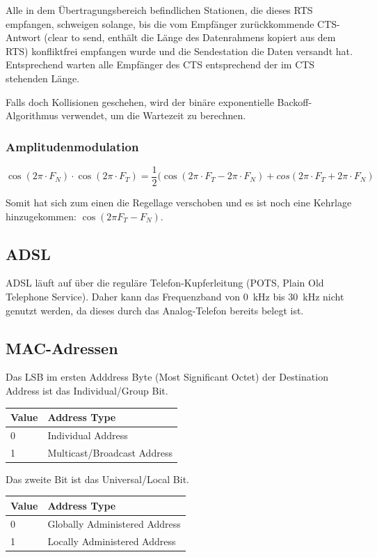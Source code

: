 Alle in dem Übertragungsbereich befindlichen Stationen, die dieses RTS
empfangen, schweigen solange, bis die vom Empfänger zurückkommende CTS-Antwort
(clear to send, enthält die Länge des Datenrahmens kopiert aus dem RTS)
konfliktfrei empfangen wurde und die Sendestation die Daten versandt hat.
Entsprechend warten alle Empfänger des CTS entsprechend der im CTS stehenden
Länge.

Falls doch Kollisionen geschehen, wird der binäre exponentielle
Backoff-Algorithmus verwendet, um die Wartezeit zu berechnen.

\subsubsection{Amplitudenmodulation}

\[
	\cos (2\pi \cdot F_N) \cdot \cos (2\pi \cdot F_T)
	= \frac{1}{2}(\cos (2\pi \cdot F_T - 2\pi \cdot F_N)
	+ cos(2\pi \cdot F_T + 2\pi \cdot F_N)
\]

Somit hat sich zum einen die Regellage verschoben und es ist noch eine Kehrlage
hinzugekommen: $\cos (2\pi F_T - F_N)$.


\subsection{ADSL}

ADSL läuft auf über die reguläre Telefon-Kupferleitung (POTS, Plain Old
Telephone Service). Daher kann das Frequenzband von 0~kHz bis 30~kHz nicht
genutzt werden, da dieses durch das Analog-Telefon bereits belegt ist.


\subsection{MAC-Adressen}

Das LSB im ersten Adddress Byte (Most Significant Octet) der Destination Address
ist das Individual/Group Bit.

\begin{tabular}[h]{|l|l|}
	\hline
  \textbf{Value} & \textbf{Address Type} \\
	\hline
  0 & Individual Address \\
  1 & Multicast/Broadcast Address \\
	\hline
\end{tabular}

Das zweite Bit ist das Universal/Local Bit.

\begin{tabular}[h]{|l|l|}
	\hline
  \textbf{Value} & \textbf{Address Type} \\
	\hline
  0 & Globally Administered Address \\
  1 & Locally Administered Address \\
	\hline
\end{tabular}

